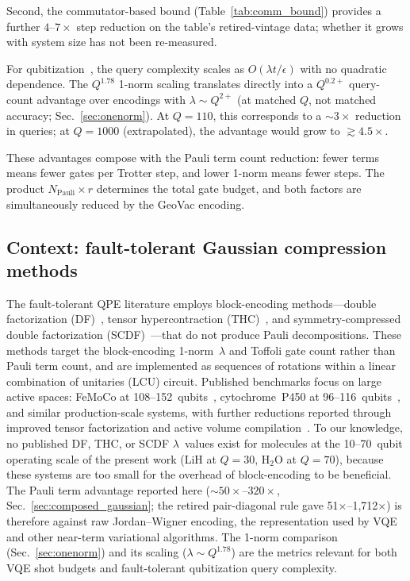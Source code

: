 \documentclass[aps,pra,twocolumn,superscriptaddress,longbibliography]{revtex4-2}
\begin{document}
Second, the commutator-based bound (Table~\ref{tab:comm_bound})
provides a further $4$--$7\times$ step reduction on the table's
retired-vintage data; whether it grows with system size has not been
re-measured.

For qubitization~\cite{childs2021,lee2021}, the query complexity
scales as $O(\lambda t / \epsilon)$ with no quadratic dependence.
The $Q^{1.78}$ 1-norm scaling translates directly into a
$Q^{0.2+}$ query-count advantage over encodings with
$\lambda \sim Q^{2+}$ (at matched $Q$, not matched accuracy;
Sec.~\ref{sec:onenorm}).  At $Q = 110$, this corresponds to a
$\sim 3\times$ reduction in queries; at $Q = 1000$ (extrapolated),
the advantage would grow to $\gtrsim 4.5\times$.

These advantages compose with the Pauli term count reduction: fewer
terms means fewer gates per Trotter step, and lower 1-norm means
fewer steps.  The product $N_{\mathrm{Pauli}} \times r$ determines
the total gate budget, and both factors are simultaneously reduced
by the GeoVac encoding.

\subsection{Context: fault-tolerant Gaussian compression methods}
\label{sec:ft_gaussian}

The fault-tolerant QPE literature employs block-encoding methods---double
factorization (DF)~\cite{motta2021}, tensor hypercontraction
(THC)~\cite{lee2021}, and symmetry-compressed double factorization
(SCDF)~\cite{rocca2024}---that do not produce Pauli decompositions.
These methods target the block-encoding 1-norm~$\lambda$ and Toffoli
gate count rather than Pauli term count, and are implemented as
sequences of rotations within a linear combination of unitaries (LCU)
circuit.  Published benchmarks focus on large active spaces: FeMoCo at
108--152~qubits~\cite{lee2021}, cytochrome~P450 at
96--116~qubits~\cite{caesura2025}, and similar production-scale systems,
with further reductions reported through improved tensor factorization
and active volume compilation~\cite{caesura2025}.
To our knowledge, no published DF, THC, or SCDF $\lambda$~values exist
for molecules at the 10--70~qubit operating scale of the present work
(LiH at $Q = 30$, H$_2$O at $Q = 70$), because these systems are too
small for the overhead of block-encoding to be beneficial.
The Pauli term advantage reported here ($\sim\!50\times$--$320\times$,
Sec.~\ref{sec:composed_gaussian}; the retired pair-diagonal rule gave
51$\times$--1,712$\times$) is therefore against raw
Jordan--Wigner encoding, the representation used by VQE and other
near-term variational algorithms.  The 1-norm comparison
(Sec.~\ref{sec:onenorm}) and its scaling ($\lambda \sim Q^{1.78}$)
are the metrics relevant for both VQE shot budgets and fault-tolerant
qubitization query complexity.
\end{document}
